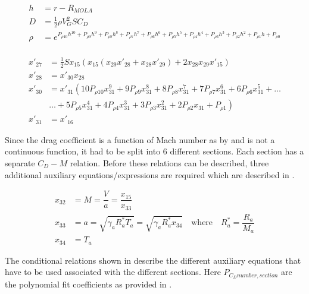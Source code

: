  \begin{equation} \label{eq:dragAux}
\begin{split}
h &= r-R_{MOLA} \\
D &= \frac{1}{2}\rho V_{G}^{2}SC_{D}\\
\rho &= e^{P_{\rho 10}h^{10}+P_{\rho 9}h^{9}+P_{\rho 8}h^{8}+P_{\rho 7}h^{7}+P_{\rho 6}h^{6}+P_{\rho 5}h^{5}+P_{\rho 4}h^{4}+P_{\rho 3}h^{3}+P_{\rho 2}h^{2}+P_{\rho 1}h+P_{\rho 0}} \\
\end{split}
\end{equation}

 \begin{equation} \label{eq:dragDerAux}
\begin{split}
x'_{27} &= \frac{1}{2}Sx_{15}\left(x_{15} \left(x_{29}x'_{28}+x_{28}x'_{29}\right)+2x_{28}x_{29}x'_{15}\right) \\
x'_{28} &= x'_{30}x_{28} \\
x'_{30} &=x'_{31} \left(10 P_{\rho 10}x_{31}^{9}+9 P_{\rho 9}x_{31}^{8}+8 P_{\rho 8}x_{31}^{7}+7 P_{\rho 7}x_{31}^{6}+6 P_{\rho 6}x_{31}^{5}+\dots \right. \\
&  \left. \dotsc +5 P_{\rho 5}x_{31}^{4}+4 P_{\rho 4}x_{31}^{3}+3 P_{\rho 3}x_{31}^{2}+2 P_{\rho 2}x_{31}+P_{\rho 1}\right) \\
x'_{31} &= x'_{16}
\end{split}
\end{equation}

Since the drag coefficient is a function of Mach number as by  and is not a continuous function, it had to be split into 6 different sections. Each section has a separate $C_{D}-M$ relation. Before these relations can be described, three additional auxiliary equations/expressions are required which are described in .

 \begin{equation} \label{eq:cdAux}
\begin{split}
x_{32} &= M = \dfrac{V}{a} = \dfrac{x_{15}}{x_{33}}\\
x_{33} &= a = \sqrt{\gamma_{a}R_{a}^{*}T_{a}} = \sqrt{\gamma_{a}R_{a}^{*}x_{34}} \quad \text{where} \quad R_{a}^{*}=\dfrac{R_{a}}{M_{a}} \\
x_{34} &= T_{a}
\end{split}
\end{equation}

The conditional relations shown in  describe the different auxiliary equations that have to be used associated with the different sections. Here $P_{C_{D} number,section}$ are the polynomial fit coefficients as provided in .

